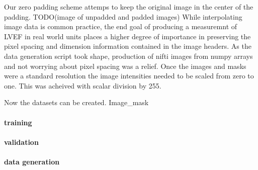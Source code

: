 \documentclass{article}
\begin{document}
Our zero padding scheme attemps to keep the original image in the center of the padding.
TODO(image of unpadded and padded images)
While interpolating image data is common practice, the end goal of producing a measuremnt of LVEF in real world units places a higher degree of importance in preserving the pixel spacing and dimension information contained in the image headers.
As the data generation script took shape, production of nifti images from numpy arrays and not worrying about pixel spacing was a relief.
Once the images and masks were a standard resolution the image intensities needed to be scaled from zero to one. This was acheived with scalar division by 255.
\par{}
Now the datasets can be created.
Image_mask
\paragraph{training}
\paragraph{validation}
\paragraph{data generation}







\end{document}
